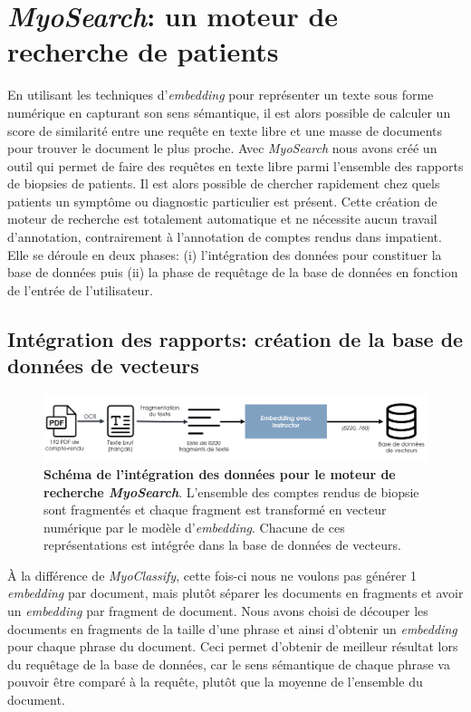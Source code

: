 \section{\textit{MyoSearch}: un moteur de recherche de patients}
En utilisant les techniques d'\textit{embedding}  pour représenter un texte sous forme numérique en capturant son sens sémantique, il est alors possible de calculer un score de similarité entre une requête en texte libre et une masse de documents pour trouver le document le plus proche. Avec \textit{MyoSearch} nous avons créé un outil qui permet de faire des requêtes en texte libre parmi l'ensemble des rapports de biopsies de patients. Il est alors possible de chercher rapidement chez quels patients un symptôme ou diagnostic particulier est présent. Cette création de moteur de recherche est totalement automatique et ne nécessite aucun travail d'annotation, contrairement à l'annotation de comptes rendus dans \gls{impatient}. Elle se déroule en deux phases: (i) l'intégration des données pour constituer la base de données puis (ii) la phase de requêtage de la base de données en fonction de l'entrée de l'utilisateur.

\subsection{Intégration des rapports: création de la base de données de vecteurs}
\begin{figure}[!ht]
 \centering
 \includegraphics[width=1\textwidth]{figures/myosearch_ingest.png}
 \caption[Intégration des données dans \textit{MyoSearch}]{\textbf{Schéma de l'intégration des données pour le moteur de recherche \textit{MyoSearch}}. L'ensemble des comptes rendus de biopsie sont fragmentés et chaque fragment est transformé en vecteur numérique par le modèle d'\textit{embedding}. Chacune de ces représentations est intégrée dans la base de données de vecteurs.}
 \label{fig:myosearch_ingest}
\end{figure}

À la différence de \textit{MyoClassify}, cette fois-ci nous ne voulons pas générer 1 \textit{embedding} par document, mais plutôt séparer les documents en fragments et avoir un \textit{embedding} par fragment de document. Nous avons choisi de découper les documents en fragments de la taille d'une phrase et ainsi d'obtenir un \textit{embedding} pour chaque phrase du document. Ceci permet d'obtenir de meilleur résultat lors du requêtage de la base de données, car le sens sémantique de chaque phrase va pouvoir être comparé à la requête, plutôt que la moyenne de l'ensemble du document.


